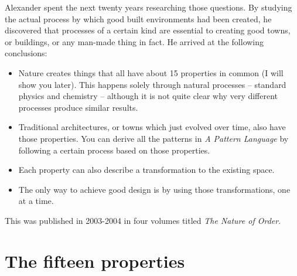 Alexander spent the next twenty years researching those questions. By studying
the actual process by which good built environments had been created, he
discovered that processes of a certain kind are essential to creating good
towns, or buildings, or any man-made thing in fact. He arrived at the following
conclusions:
\begin{itemize}
 \item Nature creates things that all have about 15 properties in common (I will
show you later). This happens solely through natural processes -- standard
physics and chemistry -- although it is not quite clear why very different
processes produce similar results.
 \item Traditional architectures, or towns which just evolved over time, also
have those properties. You can derive all the patterns in \textit{A Pattern
Language} by following a certain process based on those properties.
 \item Each property can also describe a transformation to the existing space.
 \item The only way to achieve good design is by using those transformations,
one at a time.
\end{itemize}
This was published in 2003-2004 in four volumes titled \textit{The Nature of
Order}.

\section*{The fifteen properties}

